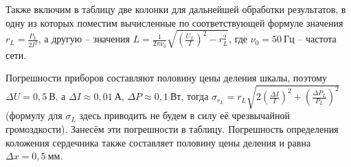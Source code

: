\documentclass[a4paper,10pt]{article}
\begin{document}
Также включим в таблицу две колонки для дальнейшей обработки результатов, в одну из которых поместим вычисленные по соответствующей формуле значения $r_L=\frac{P_L}{2I^2}$, а другую -- значения $L=\frac{1}{2\pi\nu_0}\sqrt{\left(\frac{U_L}{I}\right)^2-r_L^2}$, где $\nu_0=50~\text{Гц}$ -- частота сети.

Погрешности приборов составляют половину цены деления шкалы, поэтому $\Delta U=0,5~\text{В}$, а $\Delta I\approx0,01~\text{А}$, $\Delta P\approx0,1~\text{Вт}$, тогда $\sigma_{r_L}=r_L\sqrt{2\left(\frac{\Delta I}{I}\right)^2+\left(\frac{\Delta P_L}{P_L}\right)^2}$ (формулу для $\sigma_L$ здесь приводить не будем в силу её чрезвычайной громоздкости). Занесём эти погрешности в таблицу. Погрешность определения коложения сердечника также составляет половину цены деления и равна $\Delta x=0,5~\text{мм}$.
\end{document}
